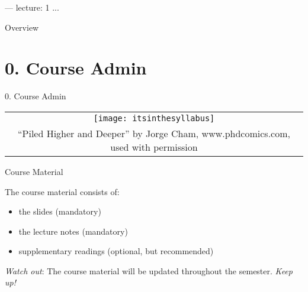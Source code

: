 ---
lecture: 1
...

\begin{frame}
	\maketitle
\end{frame}

\begin{frame}{Overview}
\tableofcontents[pausesections]
\end{frame}

\section{0. Course Admin}
\begin{frame}{0. Course Admin}

	\begin{center}
		\begin{tabular}{c}
		\texttt{[image: itsinthesyllabus]}\\
		{\tiny \textcopyright ``Piled Higher and Deeper'' by Jorge Cham,
www.phdcomics.com, used with permission}
		\end{tabular}
	\end{center}

\end{frame}

\begin{frame}{Course Material}

	The course material consists of:

	\begin{itemize}[<+->]
	
		\item the slides (mandatory)
		
		\item the lecture notes (mandatory)
		
		\item supplementary readings (optional, but recommended)
	
	\end{itemize}
	
	\emph{Watch out}: The course material will be updated throughout the semester. \emph{Keep up!}

\end{frame}

